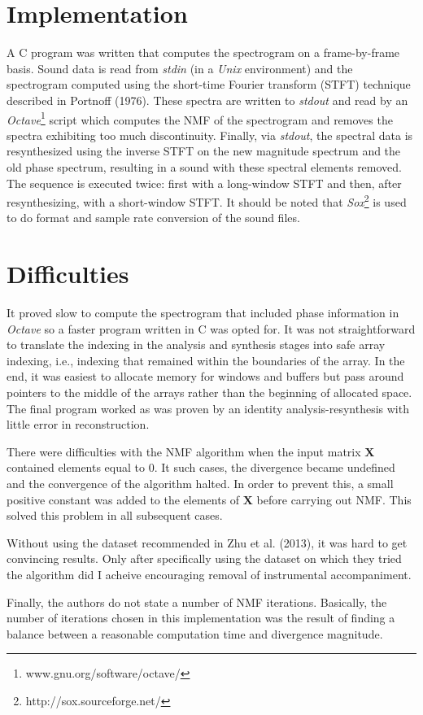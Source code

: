 \documentclass[10pt]{article}
\begin{document}
\section*{Implementation}
A C program was written that computes the spectrogram on a frame-by-frame basis.
Sound data is read from \textit{stdin} (in a \textit{Unix} environment) and the
spectrogram computed using the short-time Fourier transform (STFT) technique
described in Portnoff (1976). These spectra are written to \textit{stdout} and
read by an \textit{Octave}\footnote{www.gnu.org/software/octave/} script which
computes the NMF of the spectrogram and removes the spectra exhibiting too much
discontinuity. Finally, via \textit{stdout}, the spectral data is resynthesized
using the inverse STFT on the new magnitude spectrum and the old phase spectrum,
resulting in a sound with these spectral elements removed. The sequence is
executed twice: first with a long-window STFT and then, after resynthesizing,
with a short-window STFT. It should be noted that
\textit{Sox}\footnote{http://sox.sourceforge.net/} is used to do format and
sample rate conversion of the sound files.

\section*{Difficulties}
It proved slow to compute the spectrogram that included phase information in
\textit{Octave} so a faster program written in C was opted for. It was not
straightforward to translate the indexing in the analysis and
synthesis stages into safe array indexing, i.e., indexing that remained within
the boundaries of the array. In the end, it was easiest to allocate memory for
windows and buffers but pass around pointers to the middle of the arrays rather
than the beginning of allocated space. The final program worked as was proven
by an identity analysis-resynthesis with little error in reconstruction.
\par
There were difficulties with the NMF algorithm when the input matrix \(
\mathbf{X} \) contained elements equal to 0. It such cases, the divergence
became undefined and the convergence of the algorithm halted. In order to
prevent this, a small positive constant was added to the elements of \(
\mathbf{X} \) before carrying out NMF. This solved this problem in all
subsequent cases.
\par
Without using the dataset recommended in Zhu et al. (2013), it was hard to get
convincing results. Only after specifically using the dataset on which they
tried the algorithm did I acheive encouraging removal of instrumental
accompaniment.
\par
Finally, the authors do not state a number of NMF iterations. Basically, the
number of iterations chosen in this implementation was the result of
finding a balance between a reasonable computation time and divergence
magnitude.
\end{document}
